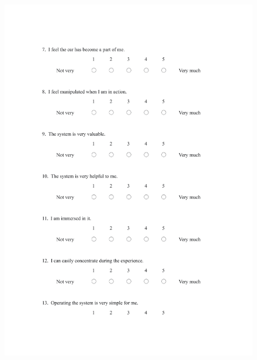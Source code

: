 \begin{figure}[h]
\centering
\includegraphics[width=1\textwidth,height=0.7\textheight]{A_thesis/appendix/Experiment 2 3_questionnaire-2.png}
\end{figure}
\newpage

